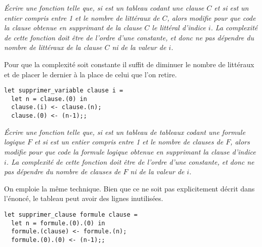 \begin{Exercise}\it
Écrire une fonction  telle que, si  est un tableau codant une clause $C$ et si  est un entier compris entre 1 et le nombre de littéraux de $C$, alors  modifie  pour que  code la clause obtenue en supprimant de la clause $C$ le littéral d’indice $i$. La complexité de cette fonction doit être de l’ordre d’une constante, et donc ne pas dépendre du nombre de littéraux de la clause $C$ ni de la valeur de $i$.
\end{Exercise}
\begin{Answer}Pour que la complexité soit constante il suffit de diminuer le nombre de littéraux et de placer le dernier à la place de celui que l'on retire.
\begin{lstlisting}
let supprimer_variable clause i =
  let n = clause.(0) in
  clause.(i) <- clause.(n);
  clause.(0) <- (n-1);;
\end{lstlisting}
\end{Answer}
\begin{Exercise}\it
Écrire une fonction  telle que, si  est un tableau de tableaux codant une formule logique $F$ et si  est un entier compris entre 1 et le nombre de clauses de $F$, alors  modifie  pour que  code la formule logique obtenue en supprimant la clause d’indice $i$. La complexité de cette fonction doit être de l’ordre d’une constante, et donc ne pas dépendre du nombre de clauses de $F$ ni de la valeur de $i$.
\end{Exercise}
\begin{Answer}On emploie la même technique. Bien que ce  ne soit pas explicitement décrit dans l'énoncé, le tableau peut avoir des lignes inutilisées.
\begin{lstlisting}
let supprimer_clause formule clause =
  let n = formule.(0).(0) in
  formule.(clause) <- formule.(n);
  formule.(0).(0) <- (n-1);;
\end{lstlisting}
\end{Answer}
